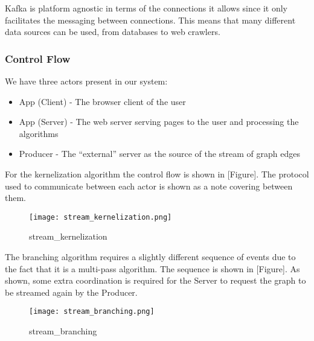 Kafka is platform agnostic in terms of the connections it allows since
it only facilitates the messaging between connections. This means that
many different data sources can be used, from databases to web crawlers.

\subsubsection{Control Flow}

We have three actors present in our system:

\begin{itemize}
    \item
          App (Client) - The browser client of the user
    \item
          App (Server) - The web server serving pages to the user and processing
          the algorithms
    \item
          Producer - The ``external'' server as the source of the stream of
          graph edges
\end{itemize}

For the kernelization algorithm the control flow is shown in
{[}Figure{]}. The protocol used to communicate between each actor is
shown as a note covering between them.

\begin{figure}[h]
    \centering
    \texttt{[image: stream\_kernelization.png]}
    \caption{stream\_kernelization}
\end{figure}

The branching algorithm requires a slightly different sequence of events
due to the fact that it is a multi-pass algorithm. The sequence is shown
in {[}Figure{]}. As shown, some extra coordination is required for the
Server to request the graph to be streamed again by the Producer.

\begin{figure}[h]
    \centering
    \texttt{[image: stream\_branching.png]}
    \caption{stream\_branching}
\end{figure}